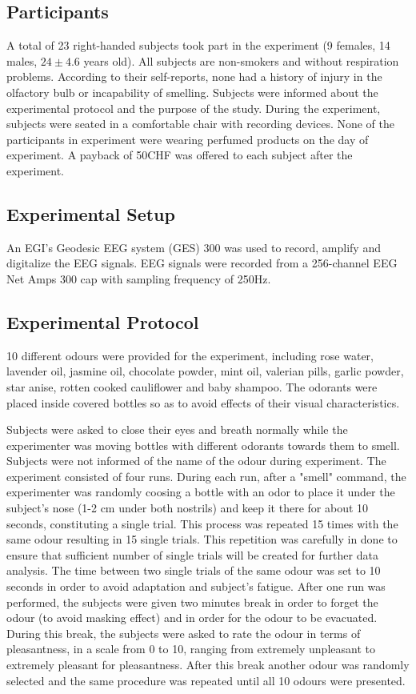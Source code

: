 \documentclass[conference]{IEEEtran}
\begin{document}
\subsection{Participants}
A total of 23 right-handed subjects took part in the experiment (9 females, 14 males, $24 \pm 4.6$ years old). All subjects are non-smokers and without respiration problems. According to their self-reports, none had a history of injury in the olfactory bulb or incapability of smelling. Subjects were informed about the experimental protocol and the purpose of the study. During the experiment, subjects were seated in a comfortable chair with recording devices. None of the participants in experiment were wearing perfumed products on the day of experiment. A payback of 50CHF was offered to each subject after the experiment. 

\subsection{Experimental Setup}
An EGI's Geodesic EEG system (GES) 300 was used to record, amplify and digitalize the EEG signals. EEG signals were recorded from a 256-channel EEG Net Amps 300 cap with sampling frequency of 250Hz.  
\subsection{Experimental Protocol}
10 different odours were provided for the experiment, including rose water, lavender oil, jasmine oil, chocolate powder, mint oil, valerian pills, garlic powder, star anise, rotten cooked cauliflower and baby shampoo. The odorants were placed inside covered bottles so as to avoid effects of their visual characteristics.  

Subjects were asked to close their eyes and breath normally while the experimenter was moving bottles with different odorants towards them to smell. Subjects were not informed of the name of the odour during experiment. The experiment consisted of four runs. During each run, after a "smell" command, the experimenter was randomly coosing a bottle with an odor to place it under the subject's nose (1-2 cm under both nostrils) and keep it there for about 10 seconds, constituting a single trial. This process was repeated 15 times with the same odour resulting in 15 single trials. This repetition was carefully in done to ensure that sufficient number of single trials will be created for further data analysis. The time between two single trials of the same odour was set to 10 seconds in order to avoid adaptation and subject's fatigue. After one run was performed, the subjects were given two minutes break in order to forget the odour (to avoid masking effect) and in order for the odour to be evacuated. During this break, the subjects were asked to rate the odour in terms of pleasantness, in a scale from 0 to 10, ranging from extremely unpleasant to extremely pleasant for pleasantness. After this break another odour was randomly selected and the same procedure was repeated until all 10 odours were presented.    
\end{document}
